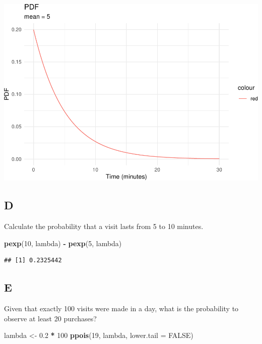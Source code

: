 \documentclass[
]{article}
\newenvironment{Shaded}{\begin{snugshade}}{\end{snugshade}}
\newcommand{\DataTypeTok}[1]{\textcolor[rgb]{0.13,0.29,0.53}{#1}}
\newcommand{\DecValTok}[1]{\textcolor[rgb]{0.00,0.00,0.81}{#1}}
\newcommand{\FloatTok}[1]{\textcolor[rgb]{0.00,0.00,0.81}{#1}}
\newcommand{\KeywordTok}[1]{\textcolor[rgb]{0.13,0.29,0.53}{\textbf{#1}}}
\newcommand{\NormalTok}[1]{#1}
\newcommand{\OperatorTok}[1]{\textcolor[rgb]{0.81,0.36,0.00}{\textbf{#1}}}
\newcommand{\OtherTok}[1]{\textcolor[rgb]{0.56,0.35,0.01}{#1}}
\newcommand{\StringTok}[1]{\textcolor[rgb]{0.31,0.60,0.02}{#1}}
\begin{document}
\includegraphics{es_files/figure-latex/unnamed-chunk-15-1.pdf}

\hypertarget{d}{%
\subsection{D}\label{d}}

Calculate the probability that a visit lasts from 5 to 10 minutes.

\begin{Shaded}
\begin{Highlighting}[]
\KeywordTok{pexp}\NormalTok{(}\DecValTok{10}\NormalTok{, lambda) }\OperatorTok{{-}}\StringTok{ }\KeywordTok{pexp}\NormalTok{(}\DecValTok{5}\NormalTok{, lambda)}
\end{Highlighting}
\end{Shaded}

\begin{verbatim}
## [1] 0.2325442
\end{verbatim}

\hypertarget{e}{%
\subsection{E}\label{e}}

Given that exactly 100 visits were made in a day, what is the
probability to observe at least 20 purchases?

\begin{Shaded}
\begin{Highlighting}[]
\NormalTok{lambda \textless{}{-}}\StringTok{ }\FloatTok{0.2} \OperatorTok{*}\StringTok{ }\DecValTok{100}
\KeywordTok{ppois}\NormalTok{(}\DecValTok{19}\NormalTok{, lambda, }\DataTypeTok{lower.tail =} \OtherTok{FALSE}\NormalTok{)}
\end{Highlighting}
\end{Shaded}
\end{document}
